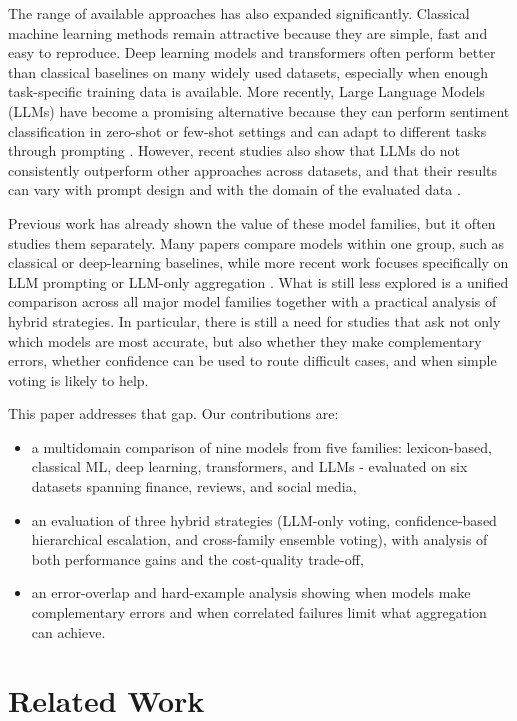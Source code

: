 \documentclass[conference]{IEEEtran}
\begin{document}
The range of available approaches has also expanded significantly. Classical machine learning methods remain attractive because they are simple, fast and easy to reproduce. Deep learning models and transformers often perform better than classical baselines on many widely used datasets, especially when enough task-specific training data is available. More recently, Large Language Models (LLMs) have become a promising alternative because they can perform sentiment classification in zero-shot or few-shot settings and can adapt to different tasks through prompting \cite{zhang2024sentiment} \cite{liskowski2026large}. However, recent studies also show that LLMs do not consistently outperform other approaches across datasets, and that their results can vary with prompt design and with the domain of the evaluated data \cite{sa-in-age-of-genai} \cite{herrera2025overview}.

Previous work has already shown the value of these model families, but it often studies them separately. Many papers compare models within one group, such as classical or deep-learning baselines, while more recent work focuses specifically on LLM prompting or LLM-only aggregation \cite{sun2023sentiment} \cite{zhang2024sentiment}. What is still less explored is a unified comparison across all major model families together with a practical analysis of hybrid strategies. In particular, there is still a need for studies that ask not only which models are most accurate, but also whether they make complementary errors, whether confidence can be used to route difficult cases, and when simple voting is likely to help.

This paper addresses that gap. Our contributions are:
\begin{itemize}
    \item a multidomain comparison of nine models from five families: lexicon-based, classical ML, deep learning, transformers, and LLMs - evaluated on six datasets spanning finance, reviews, and social media,
    \item an evaluation of three hybrid strategies (LLM-only voting, confidence-based hierarchical escalation, and cross-family ensemble voting), with analysis of both performance gains and the cost-quality trade-off,
    \item an error-overlap and hard-example analysis showing when models make complementary errors and when correlated failures limit what aggregation can achieve.
\end{itemize}

\section{Related Work}
\end{document}
